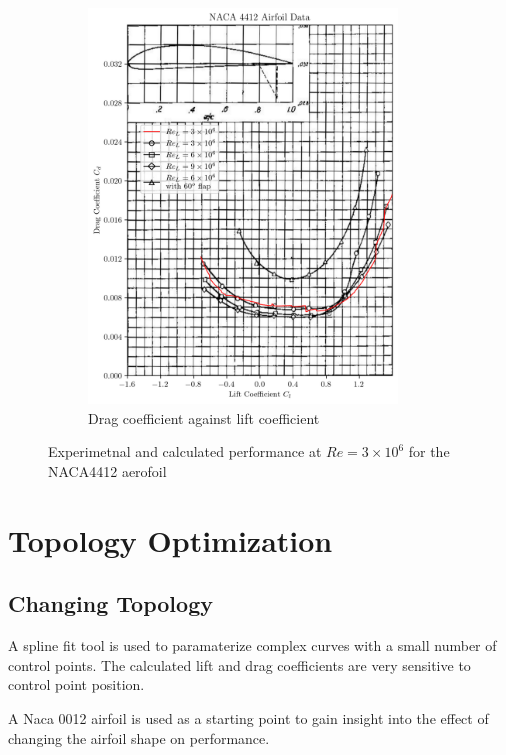 \documentclass{article}
\begin{document}
\begin{figure}[H]
\begin{subfigure}{0.45\textwidth}
        \includegraphics[width=0.9\textwidth]{figures/NACA4412_drag_validation.png}
        \caption{Drag coefficient against lift coefficient}
        \label{fig:4412_drag_validation}
    \end{subfigure}
    \caption{Experimetnal and calculated performance at $Re = 3\times10^6$ for the NACA4412 aerofoil}
\end{figure}

\section{Topology Optimization}

\subsection{Changing Topology}

A spline fit tool is used to paramaterize complex curves with a small number of control points.
The calculated lift and drag coefficients are very sensitive to control point position.

A Naca 0012 airfoil is used as a starting point to gain insight into the effect of changing the airfoil shape on performance.
\end{document}
